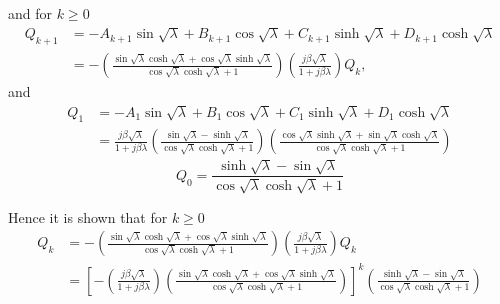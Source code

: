 \documentclass{article}
\begin{document}
and for $k \geq 0$
\begin{equation}
    \begin{aligned}
        Q_{k+1} &= - A_{k+1} \sin{\sqrt{\lambda}} + B_{k+1} \cos{\sqrt{\lambda}} + C_{k+1} \sinh{\sqrt{\lambda}} + D_{k+1} \cosh{\sqrt{\lambda}} \\
        &= - \left( \frac{ \sin\sqrt{\lambda} \cosh\sqrt{\lambda} + \cos\sqrt{\lambda} \sinh\sqrt{\lambda} }{ \cos\sqrt{\lambda }\cosh\sqrt{\lambda }+1 } \right) \left( \frac{j \beta \sqrt{\lambda }}{1+j \beta \lambda } \right) Q_k,
    \end{aligned}
\end{equation}
and
\begin{equation}
    \begin{aligned}
        Q_{1} &= - A_1 \sin{\sqrt{\lambda}} + B_1 \cos{\sqrt{\lambda}} + C_1 \sinh{\sqrt{\lambda}} + D_1 \cosh{\sqrt{\lambda}} \\
        &= \frac{j \beta  \sqrt{\lambda }}{1+j \beta  \lambda } \left(\frac{\sin\sqrt{\lambda } -\sinh\sqrt{\lambda }}{\cos\sqrt{\lambda } \cosh\sqrt{\lambda }+1} \right)  \left( \frac{\cos\sqrt{\lambda } \sinh\sqrt{\lambda }+\sin\sqrt{\lambda } \cosh\sqrt{\lambda }}{\cos\sqrt{\lambda } \cosh\sqrt{\lambda }+1} \right)
    \end{aligned}
\end{equation}
\begin{equation}
    Q_0 = \frac{\sinh\sqrt{\lambda }-\sin\sqrt{\lambda }}{\cos\sqrt{\lambda } \cosh\sqrt{\lambda }+1}
\end{equation}

Hence it is shown that for $k \geq 0$
\begin{equation}
    \begin{aligned}
        Q_{k} &= - \left( \frac{ \sin\sqrt{\lambda} \cosh\sqrt{\lambda} + \cos\sqrt{\lambda} \sinh\sqrt{\lambda} }{ \cos\sqrt{\lambda }\cosh\sqrt{\lambda }+1 } \right) \left( \frac{j \beta \sqrt{\lambda }}{1+j \beta \lambda } \right) Q_k \\
        &= \left[- \left( \frac{j \beta \sqrt{\lambda }}{1+j \beta \lambda } \right) \left( \frac{ \sin\sqrt{\lambda} \cosh\sqrt{\lambda} + \cos\sqrt{\lambda} \sinh\sqrt{\lambda} }{ \cos\sqrt{\lambda }\cosh\sqrt{\lambda }+1 } \right)  \right]^k \left( \frac{\sinh\sqrt{\lambda }-\sin\sqrt{\lambda }}{\cos\sqrt{\lambda } \cosh\sqrt{\lambda }+1} \right)
    \end{aligned}
\end{equation}
\end{document}

